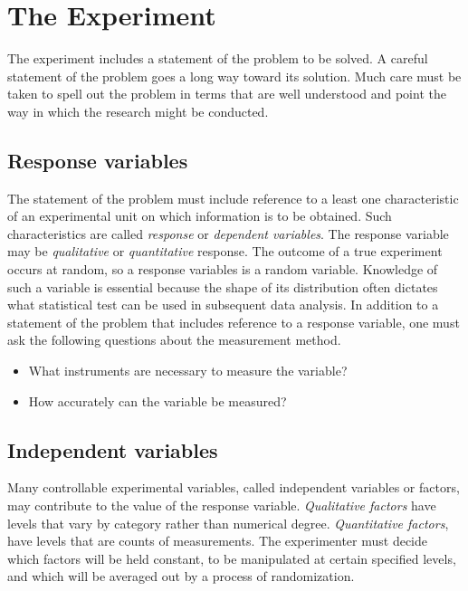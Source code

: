 \documentclass{WileySev}
\begin{document}
\section{The Experiment}

The experiment includes a statement of the problem to be solved. A careful statement of the problem goes a long way toward its solution. Much care must be taken to spell out the problem in terms that are well understood and point the way in which the research might be conducted.

\subsection{Response variables}

The statement of the problem must include reference to a least one characteristic of an experimental unit on which information is to be obtained. Such characteristics are called \textit{response} or 
\textit{dependent variables}. The response variable may be \textit{qualitative} or \textit{quantitative} response. The outcome of a true experiment occurs at random, so a response variables is a random variable. Knowledge of such a variable is essential because the shape of its distribution often dictates what statistical test can be used in subsequent data analysis. In addition to a statement of the problem that includes reference to a response variable, one must ask the following questions about the measurement method.

\begin{itemize}
\item
What instruments are necessary to measure the variable?
\item
How accurately can the variable be measured?
\end{itemize}

\subsection{Independent variables}

Many controllable experimental variables, called independent variables or factors, may contribute to the value of the response variable. \textit{Qualitative factors} have levels that vary by category rather than numerical degree. \textit{Quantitative factors},  have levels that are counts of measurements. The experimenter must decide which factors will be held constant, to be manipulated at certain specified levels, and which will be averaged out by a process of randomization.
\end{document}
